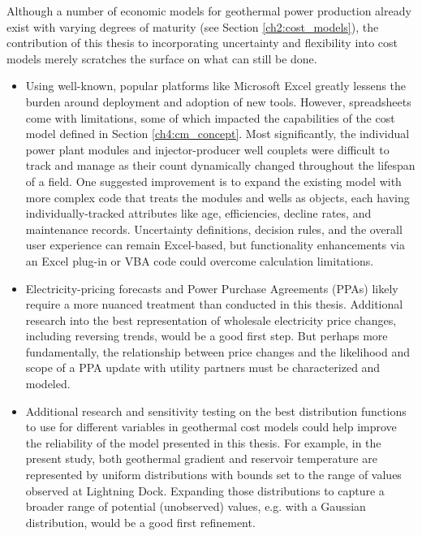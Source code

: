 Although a number of economic models for geothermal power production already exist with varying degrees of maturity (see Section \ref{ch2:cost_models}), the contribution of this thesis to incorporating uncertainty and flexibility into cost models merely scratches the surface on what can still be done.
\begin{itemize}
    \item Using well-known, popular platforms like Microsoft Excel greatly lessens the burden around deployment and adoption of new tools. However, spreadsheets come with limitations, some of which impacted the capabilities of the cost model defined in Section \ref{ch4:cm_concept}. Most significantly, the individual power plant modules and injector-producer well couplets were difficult to track and manage as their count dynamically changed throughout the lifespan of a field. One suggested improvement is to expand the existing model with more complex code that treats the modules and wells as objects, each having individually-tracked attributes like age, efficiencies, decline rates, and maintenance records. Uncertainty definitions, decision rules, and the overall user experience can remain Excel-based, but functionality enhancements via an Excel plug-in or VBA code could overcome calculation limitations.
    
    \item Electricity-pricing forecasts and Power Purchase Agreements (PPAs) likely require a more nuanced treatment than conducted in this thesis. Additional research into the best representation of wholesale electricity price changes, including reversing trends, would be a good first step. But perhaps more fundamentally, the relationship between price changes and the likelihood and scope of a PPA update with utility partners must be characterized and modeled.
    
    \item Additional research and sensitivity testing on the best distribution functions to use for different variables in geothermal cost models could help improve the reliability of the model presented in this thesis. For example, in the present study, both geothermal gradient and reservoir temperature are represented by uniform distributions with bounds set to the range of values observed at Lightning Dock. Expanding those distributions to capture a broader range of potential (unobserved) values, e.g. with a Gaussian distribution, would be a good first refinement.
    

\end{itemize}

